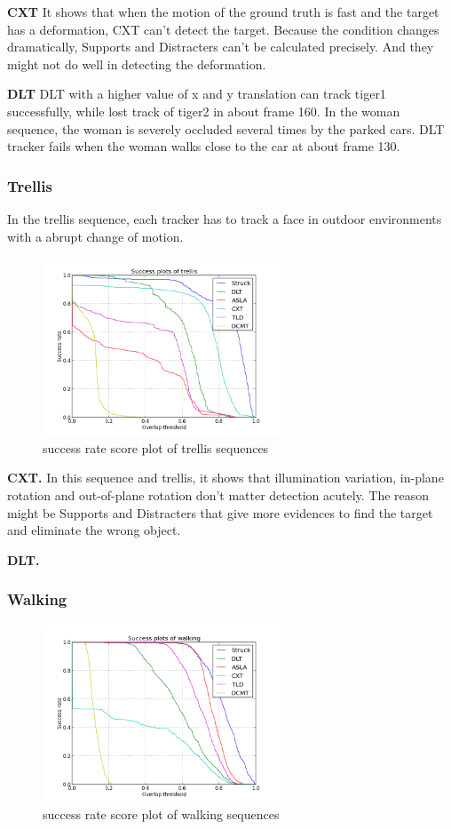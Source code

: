 \documentclass{acm_proc_article-sp}
\begin{document}
\textbf{CXT} It shows that when the motion of the ground truth is fast and the target has a deformation, CXT can't detect the target. Because the condition changes dramatically, Supports and Distracters can't be calculated precisely. And they might not do well in detecting the deformation.

\textbf{DLT} DLT with a higher value of x and y translation can track tiger1 successfully, while lost track of tiger2 in about frame 160. In the woman sequence, the woman is severely occluded several times by the parked cars. DLT tracker fails when the woman walks close to the car at about frame 130.

\subsubsection{Trellis}

In the trellis sequence, each tracker has to track a face in outdoor environments with a abrupt change of motion.

\begin{figure}[hbt]
    \includegraphics[width=200pt]{trellis}
    \caption{success rate score plot of trellis sequences}
    \label{fig:trellis}
\end{figure}

\textbf{CXT.} In this sequence and trellis, it shows that illumination variation, in-plane rotation and out-of-plane rotation don't matter detection acutely. The reason might be Supports and Distracters that give more evidences to find the target and eliminate the wrong object.

\textbf{DLT.}

\subsubsection{Walking}

\begin{figure}[hbt]
    \includegraphics[width=200pt]{walking}
    \caption{success rate score plot of walking sequences}
    \label{fig:walking}
\end{figure}
\end{document}
